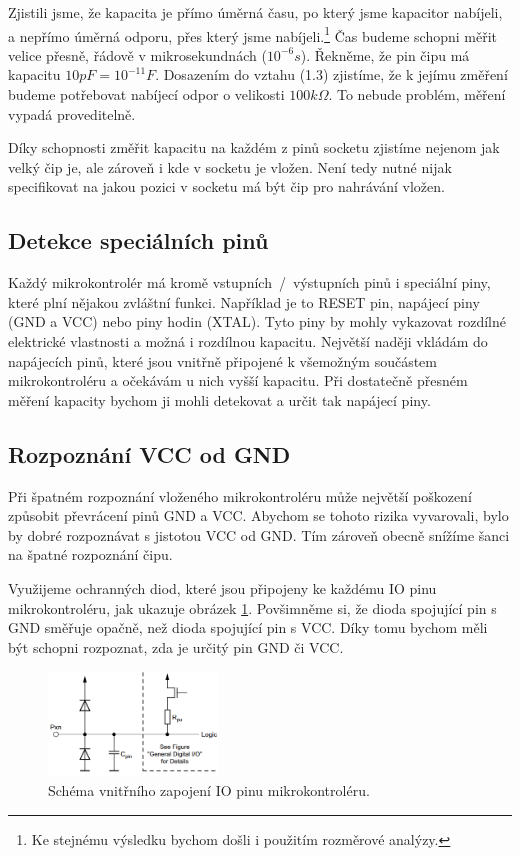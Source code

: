 \documentclass[11pt,a4paper,twoside,openright]{report}
\begin{document}
Zjistili jsme, že kapacita je přímo úměrná času, po který jsme kapacitor nabíjeli, a nepřímo úměrná odporu, přes který jsme nabíjeli.\footnote{Ke stejnému výsledku bychom došli i použitím rozměrové analýzy.} Čas budeme schopni měřit velice přesně, řádově v mikrosekundnách ($10^{-6} s $). Řekněme, že pin čipu má kapacitu $10 pF = 10^{-11} F$. Dosazením do vztahu (1.3) zjistíme, že k jejímu změření budeme potřebovat nabíjecí odpor o velikosti $100 k\Omega$. To nebude problém, měření vypadá proveditelně.

Díky schopnosti změřit kapacitu na každém z pinů socketu zjistíme nejenom jak velký čip je, ale zároveň i kde v socketu je vložen. Není tedy nutné nijak specifikovat na jakou pozici v socketu má být čip pro nahrávání vložen.

\subsection {Detekce speciálních pinů}

Každý mikrokontrolér má kromě vstupních~/~výstupních pinů i speciální piny, které plní nějakou zvláštní funkci. Například je to RESET pin, napájecí piny (GND a VCC) nebo piny hodin (XTAL). Tyto piny by mohly vykazovat rozdílné elektrické vlastnosti a možná i rozdílnou kapacitu. Největší naději vkládám do napájecích pinů, které jsou vnitřně připojené k všemožným součástem mikrokontroléru a očekávám u nich vyšší kapacitu. Při dostatečně přesném měření kapacity bychom ji mohli detekovat a určit tak napájecí piny.

\subsection {Rozpoznání VCC od GND\label{VCCvsGND}}

Při špatném rozpoznání vloženého mikrokontroléru může největší poškození způsobit převrácení pinů GND a VCC. Abychom se tohoto rizika vyvarovali, bylo by dobré rozpoznávat s jistotou VCC od GND. Tím zároveň obecně snížíme šanci na špatné rozpoznání čipu.

Využijeme ochranných diod, které jsou připojeny ke každému IO pinu mikrokontroléru, jak ukazuje obrázek \ref{fig:pin_diagram}. Povšimněme si, že dioda spojující pin s GND směřuje opačně, než dioda spojující pin s VCC. Díky tomu bychom měli být schopni rozpoznat, zda je určitý pin GND či VCC.

\begin{figure}[ht!]
  \includegraphics[width=0.4\textwidth]{img/pin_diagram.png}
  \centering
  \caption{Schéma vnitřního zapojení IO pinu mikrokontroléru.\cite[str.~58]{atmega328}}
  \label{fig:pin_diagram}
\end{figure}
\end{document}
